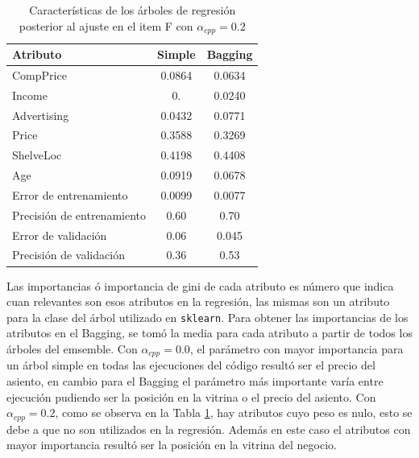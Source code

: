\begin{table}[H]
	\begin{small}
		\begin{center}
			\begin{tabular}[c]{l|c|c}
				Atributo	&Simple		& Bagging	\\\hline \hline
				CompPrice   &0.0864		& 0.0634	\\ \hline
				Income      &0.     	& 0.0240	\\ \hline
				Advertising &0.0432		& 0.0771	\\ \hline
				Price       &0.3588		& 0.3269	\\ \hline
				ShelveLoc   &0.4198		& 0.4408	\\ \hline
				Age         &0.0919		& 0.0678	\\ \hline
				\hline
				Error de entrenamiento		& 0.0099& 0.0077\\  \hline
				Precisión de entrenamiento 	& 0.60 	& 0.70 \\ \hline
				Error de validación 		& 0.06 & 0.045 \\ \hline
				Precisión de validación 	& 0.36 	& 0.53 \\\hline
			\end{tabular}
		\end{center}
	\end{small}
	\caption{Características de los árboles de regresión posterior al ajuste en el item F con $\alpha_{cpp}=0.2$}
	\label{tab:item_F_2}
\end{table}


Las importancias ó importancia de gini de cada atributo es número que indica cuan relevantes son esos atributos en la regresión, las mismas son un atributo para la clase del árbol utilizado en \verb|sklearn|. Para obtener las importancias de los atributos en el Bagging, se tomó la media para cada atributo a partir de todos los árboles del emsemble. Con $\alpha_{cpp}=0.0$, el parámetro con mayor importancia para un árbol simple en todas las ejecuciones del código resultó ser el precio del asiento, en cambio para el Bagging el parámetro más importante varía entre ejecución pudiendo ser la posición en la vitrina o el precio del asiento. Con $\alpha_{cpp}=0.2$, como se observa en la Tabla \ref{tab:item_F_2}, hay atributos cuyo peso es nulo, esto se debe a que no son utilizados en la regresión. Además en este caso el atributos con mayor importancia resultó ser la posición en la vitrina del negocio.

